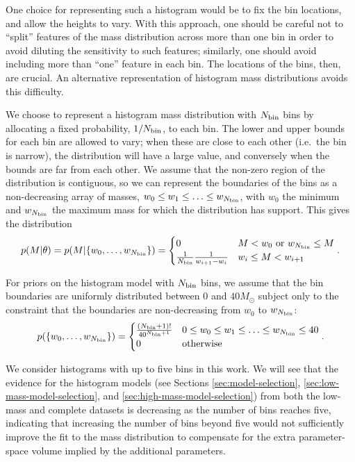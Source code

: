\documentclass[preprint]{aastex}
\newcommand{\Msun}{M_\odot}
\newcommand{\Nbin}{N_{\textnormal{bin}}}
\begin{document}
One choice for representing such a histogram would be to fix the bin
locations, and allow the heights to vary.  With this approach, one
should be careful not to ``split'' features of the mass distribution
across more than one bin in order to avoid diluting the sensitivity to
such features; similarly, one should avoid including more than ``one''
feature in each bin.  The locations of the bins, then, are crucial.
An alternative representation of histogram mass distributions avoids
this difficulty.

We choose to represent a histogram mass distribution with $\Nbin$ bins
by allocating a fixed probability, $1/\Nbin$, to each bin.  The lower
and upper bounds for each bin are allowed to vary; when these are
close to each other (i.e.\ the bin is narrow), the distribution will
have a large value, and conversely when the bounds are far from each
other.  We assume that the non-zero region of the distribution is
contiguous, so we can represent the boundaries of the bins as a
non-decreasing array of masses, $w_0 \leq w_1 \leq \ldots \leq
w_{\Nbin}$, with $w_0$ the minimum and $w_{\Nbin}$ the maximum mass
for which the distribution has support.  This gives the distribution
\begin{equation}
  \label{eq:hist-def}
  p(M|\theta) = p(M|\{w_0, \ldots, w_{\Nbin}\}) = 
  \begin{cases}
    0 & M < w_0 \textnormal{ or } w_{\Nbin} \leq M \\
    \frac{1}{\Nbin} \frac{1}{w_{i+1} - w_i} & w_i \leq M < w_{i+1}
  \end{cases}.
\end{equation}

For priors on the histogram model with $\Nbin$ bins, we assume that
the bin boundaries are uniformly distributed between 0 and $40 \Msun$
subject only to the constraint that the boundaries are non-decreasing
from $w_0$ to $w_{\Nbin}$:
\begin{equation}
  p(\{w_0, \ldots, w_{\Nbin}\}) = 
  \begin{cases}
    \frac{\left(\Nbin+1\right)!}{40^{\Nbin+1}} & 0 \leq w_0 \leq w_1
    \leq \ldots \leq w_{\Nbin} \leq 40 \\
    0 & \textnormal{otherwise}
  \end{cases}.
\end{equation}

We consider histograms with up to five bins in this work.  We will see
that the evidence for the histogram models (see Sections
\ref{sec:model-selection}, \ref{sec:low-mass-model-selection}, and
\ref{sec:high-mass-model-selection}) from both the low-mass and
complete datasets is decreasing as the number of bins reaches five,
indicating that increasing the number of bins beyond five would not
sufficiently improve the fit to the mass distribution to compensate
for the extra parameter-space volume implied by the additional
parameters.
\end{document}
